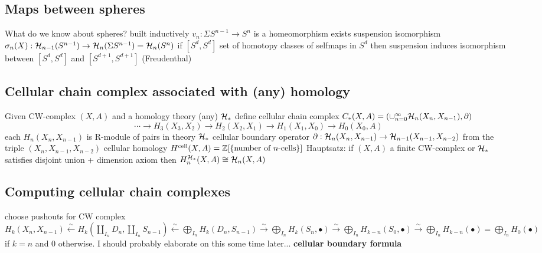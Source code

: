 \subsection{Maps between spheres}

\begin{outline}
What do we know about spheres?
    \1 built inductively
        \2 $v_n: \Sigma S^{n-1}\rightarrow S^n$ is a homeomorphism
    \1 exists suspension isomorphism
        \2 $\sigma_n(X):\mathcal{H}_{n-1}(S^{n-1})\rightarrow \mathcal{H}_{n}(\Sigma S^{n-1})= \mathcal{H}_{n}(S^n)$
    \1 if $[S^d,S^d]$ set of homotopy classes of selfmaps in $S^d$ then suspension induces isomorphism between $[S^d,S^d]$ and $[S^{d+1},S^{d+1}]$ (Freudenthal)
\end{outline}

\subsection{Cellular chain complex associated with (any) homology}


\begin{outline}
\0 Given CW-complex $(X,A)$ and a homology theory (any) $\mathcal{H}_*$ define
    \1 cellular chain complex $C_*(X,A)= (\cup^\infty_{n=0} \mathcal{H}_n(X_n,X_{n-1}), \partial)$
    $$\cdots \longrightarrow H_3(X_3,X_2) \longrightarrow H_2(X_2,X_1) \longrightarrow H_1(X_1,X_0) \longrightarrow H_0(X_0,A)$$
        \2 each $H_n(X_n,X_{n-1})$ is R-module of pairs in theory $\mathcal{H}_*$
        \2 cellular boundary operator $\partial: \mathcal{H}_n(X_n,X_{n-1}) \rightarrow \mathcal{H}_{n-1}(X_{n-1},X_{n-2})$ from the triple $(X_n,X_{n-1},X_{n-2})$
    \1 cellular homology $H^{\operatorname{cell}}(X,A) = \mathbb{Z} [\{\text{number of $n$-cells}\}]$
    \1 Hauptsatz:
        \2 if $(X,A)$ a finite CW-complex or $\mathcal{H}_*$ satisfies disjoint union + dimension axiom then $H_n^{\mathcal{H}_*}(X,A) \cong \mathcal{H}_n(X,A)$
\end{outline}

\subsection{Computing cellular chain complexes}


\begin{outline}
    \1 choose pushouts for CW complex
    \1 $H_k(X_n,X_{n-1}) \xleftarrow{\sim} H_k(\coprod_{I_n} D_n, \coprod_{I_n} S_{n-1}) \xleftarrow{\sim} \bigoplus_{I_n} H_k(D_n,S_{n-1}) \xrightarrow{\sim} \bigoplus_{I_n} H_k(S_n, \bullet)\xrightarrow{\sim} \bigoplus_{I_n} H_{k-n}(S_0, \bullet) \xrightarrow{\sim} \bigoplus_{I_n} H_{k-n}(\bullet) = \bigoplus_{I_n}H_0(\bullet)$ if $k=n$ and $0$ otherwise.
        \2 I should probably elaborate on this some time later...
    \1 \textbf{cellular boundary formula}
\end{outline}

